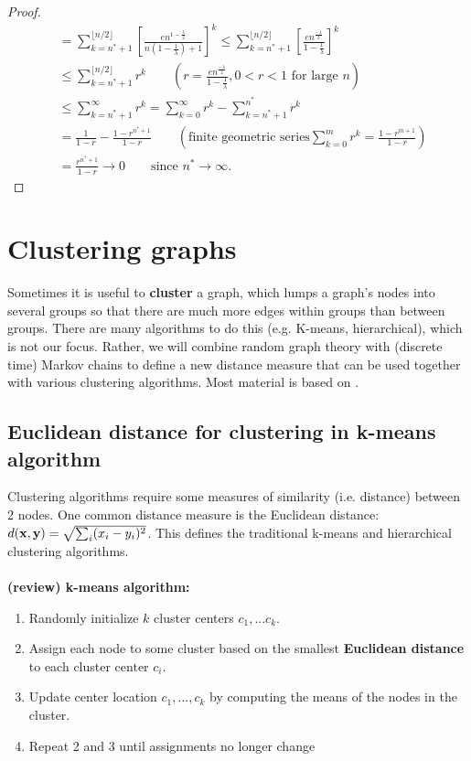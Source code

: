 \documentclass[./some_latex_template.tex]{subfiles}
\begin{document}
\begin{proof}
\begin{align*}
	&= \sum_{k=n^* + 1}^{\lfloor n/2 \rfloor} \left[\frac{en^{1 - \frac{\lambda}{2}}}{n(1 - \frac{1}{\lambda}) + 1}\right]^k \le \sum_{k=n^* + 1}^{\lfloor n/2 \rfloor} \left[\frac{en^{\frac{-\lambda}{2}}}{1 - \frac{1}{\lambda}}\right]^k\\
	&\le \sum_{k=n^* + 1}^{\lfloor n/2 \rfloor}  r^k \qquad (r = \frac{en^{\frac{-\lambda}{2}}}{1 - \frac{1}{\lambda}}, 0 < r < 1 \text{ for large }n)\\
	&\le \sum_{k=n^* + 1}^{\infty}r^k  = \sum_{k=0}^{\infty}r^k - \sum_{k=n^* + 1}^{n^*}r^k\\
	&= \frac{1}{1-r} - \frac{1-r^{n^*+1}}{1-r} \qquad \left(\text{finite geometric series} \sum_{k=0}^{m}r^k = \frac{1-r^{m+1}}{1-r}\right)\\
	&= \frac{r^{n^* + 1}}{1-r} \longrightarrow 0 \qquad \text{since } n^* \rightarrow \infty.
\end{align*}
\end{proof}

\section{Clustering graphs}

Sometimes it is useful to \textbf{cluster} a graph, which lumps a graph's nodes into several groups so that there are much more edges within groups than between groups. There are many algorithms to do this (e.g. K-means, hierarchical), which is not our focus. Rather, we will combine random graph theory with (discrete time) Markov chains to define a new distance measure that can be used together with various clustering algorithms. Most material is based on \cite{yen2005clustering}. 

\subsection{Euclidean distance for clustering in k-means algorithm}

Clustering algorithms require some measures of similarity (i.e. distance) between 2 nodes. One common distance measure is the Euclidean distance: $d(\mathbf{x}, \mathbf{y}) = \sqrt{\sum_{i}(x_i - y_i)^2}$. This defines the traditional k-means and hierarchical clustering algorithms.\\
\\
\textbf{(review) k-means algorithm:}
\begin{enumerate}
	\item Randomly initialize $k$ cluster centers $c_1,...c_k$. 
	\item Assign each node to some cluster based on the smallest \textbf{Euclidean distance} to each cluster center $c_i$.
	\item Update center location $c_1, ..., c_k$ by computing the means of the nodes in the cluster. 
	\item Repeat 2 and 3 until assignments no longer change
\end{enumerate}
\end{document}
